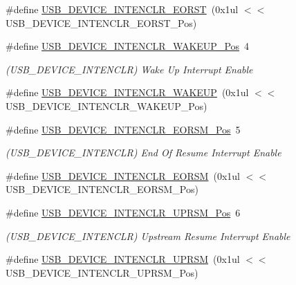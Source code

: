 \begin{DoxyCompactItemize}
\#define \mbox{\hyperlink{group___s_a_m_d21___u_s_b_ga73304a6171c53a0b1095545a0daf5548}{U\+S\+B\+\_\+\+D\+E\+V\+I\+C\+E\+\_\+\+I\+N\+T\+E\+N\+C\+L\+R\+\_\+\+E\+O\+R\+ST}}~(0x1ul $<$$<$ U\+S\+B\+\_\+\+D\+E\+V\+I\+C\+E\+\_\+\+I\+N\+T\+E\+N\+C\+L\+R\+\_\+\+E\+O\+R\+S\+T\+\_\+\+Pos)
\item 
\#define \mbox{\hyperlink{group___s_a_m_d21___u_s_b_gaa2138552cbf627a1ebeebf93d23dd98a}{U\+S\+B\+\_\+\+D\+E\+V\+I\+C\+E\+\_\+\+I\+N\+T\+E\+N\+C\+L\+R\+\_\+\+W\+A\+K\+E\+U\+P\+\_\+\+Pos}}~4
\begin{DoxyCompactList}\small\item\em (U\+S\+B\+\_\+\+D\+E\+V\+I\+C\+E\+\_\+\+I\+N\+T\+E\+N\+C\+LR) Wake Up Interrupt Enable \end{DoxyCompactList}\item 
\#define \mbox{\hyperlink{group___s_a_m_d21___u_s_b_gaa973618d4b8aa90c9ff4f711c09f52af}{U\+S\+B\+\_\+\+D\+E\+V\+I\+C\+E\+\_\+\+I\+N\+T\+E\+N\+C\+L\+R\+\_\+\+W\+A\+K\+E\+UP}}~(0x1ul $<$$<$ U\+S\+B\+\_\+\+D\+E\+V\+I\+C\+E\+\_\+\+I\+N\+T\+E\+N\+C\+L\+R\+\_\+\+W\+A\+K\+E\+U\+P\+\_\+\+Pos)
\item 
\#define \mbox{\hyperlink{group___s_a_m_d21___u_s_b_gac20c4c3b35e34f18f4c8967128235f77}{U\+S\+B\+\_\+\+D\+E\+V\+I\+C\+E\+\_\+\+I\+N\+T\+E\+N\+C\+L\+R\+\_\+\+E\+O\+R\+S\+M\+\_\+\+Pos}}~5
\begin{DoxyCompactList}\small\item\em (U\+S\+B\+\_\+\+D\+E\+V\+I\+C\+E\+\_\+\+I\+N\+T\+E\+N\+C\+LR) End Of Resume Interrupt Enable \end{DoxyCompactList}\item 
\#define \mbox{\hyperlink{group___s_a_m_d21___u_s_b_ga1fb6ef97ede25b2c4bce9efea375503f}{U\+S\+B\+\_\+\+D\+E\+V\+I\+C\+E\+\_\+\+I\+N\+T\+E\+N\+C\+L\+R\+\_\+\+E\+O\+R\+SM}}~(0x1ul $<$$<$ U\+S\+B\+\_\+\+D\+E\+V\+I\+C\+E\+\_\+\+I\+N\+T\+E\+N\+C\+L\+R\+\_\+\+E\+O\+R\+S\+M\+\_\+\+Pos)
\item 
\#define \mbox{\hyperlink{group___s_a_m_d21___u_s_b_gaf00a9cc7618b7addca1818fbd652a2bb}{U\+S\+B\+\_\+\+D\+E\+V\+I\+C\+E\+\_\+\+I\+N\+T\+E\+N\+C\+L\+R\+\_\+\+U\+P\+R\+S\+M\+\_\+\+Pos}}~6
\begin{DoxyCompactList}\small\item\em (U\+S\+B\+\_\+\+D\+E\+V\+I\+C\+E\+\_\+\+I\+N\+T\+E\+N\+C\+LR) Upstream Resume Interrupt Enable \end{DoxyCompactList}\item 
\#define \mbox{\hyperlink{group___s_a_m_d21___u_s_b_ga207564a9215a2264e14f23853371d9e5}{U\+S\+B\+\_\+\+D\+E\+V\+I\+C\+E\+\_\+\+I\+N\+T\+E\+N\+C\+L\+R\+\_\+\+U\+P\+R\+SM}}~(0x1ul $<$$<$ U\+S\+B\+\_\+\+D\+E\+V\+I\+C\+E\+\_\+\+I\+N\+T\+E\+N\+C\+L\+R\+\_\+\+U\+P\+R\+S\+M\+\_\+\+Pos)

\end{DoxyCompactItemize}
